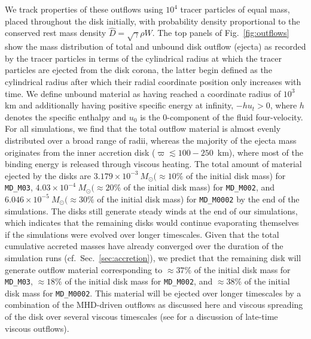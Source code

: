 We track properties of these outflows using $10^4$ tracer particles of equal mass, placed throughout the disk initially, with probability density proportional to the conserved rest mass density $\hat D = \sqrt \gamma \rho W$. The top panels of Fig.~\ref{fig:outflows} show the mass distribution of total and unbound disk outflow (ejecta) as recorded by the tracer particles in terms of the cylindrical radius at which the tracer particles are ejected from the disk corona, the latter begin defined as the cylindrical radius after which their radial coordinate position only increases with time. We define unbound material as having reached a coordinate radius of $10^3$\,km and additionally having positive specific energy at infinity, $-hu_t > 0$, where $h$ denotes the specific enthalpy and $u_0$ is the 0-component of the fluid four-velocity. For all simulations, we find that the total outflow material is almost evenly distributed over a broad  range of radii, whereas the majority of the ejecta mass originates from the inner accretion disk ($\varpi\lesssim100-250$~km), where most of the binding energy is released through viscous heating. The total amount of material ejected by the disks are $3.179\times 10^{-3}~M_\odot (\approx 10\%$ of the initial disk mass) for \texttt{MD\_M03}, $4.03\times 10^{-4}~M_\odot (\approx 20\%$ of the initial disk mass) for \texttt{MD\_M002}, and $6.046\times 10^{-5}~M_\odot (\approx 30\%$ of the initial disk mass) for \texttt{MD\_M0002} by the end of the simulations. The disks still generate steady winds at the end of our simulations, which indicates that the remaining disks would continue evaporating themselves if the simulations were evolved over longer timescales. Given that the total cumulative accreted masses have already converged over the duration of the simulation runs (cf.~Sec.~\ref{sec:accretion}), we predict that the remaining disk will generate outflow material corresponding to $\approx\! 37\%$ of the initial disk mass for \texttt{MD\_M03}, $\approx\! 18\%$ of the initial disk mass for \texttt{MD\_M002}, and $\approx\! 38\%$ of the initial disk mass for \texttt{MD\_M0002}. This material will be ejected over longer timescales by a combination of the MHD-driven outflows as discussed here and viscous spreading of the disk over several viscous timescales (see \cite{fernandez_long-term_2019} for a discussion of late-time viscous outflows).

